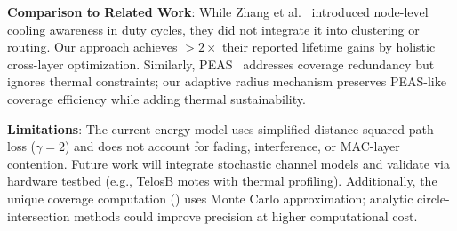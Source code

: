 \textbf{Comparison to Related Work}: While Zhang et al.~\cite{zhang_cooling2021} introduced node-level cooling awareness in duty cycles, they did not integrate it into clustering or routing. Our approach achieves $>2\times$ their reported lifetime gains by holistic cross-layer optimization. Similarly, PEAS~\cite{ye2003peas} addresses coverage redundancy but ignores thermal constraints; our adaptive radius mechanism preserves PEAS-like coverage efficiency while adding thermal sustainability.

\textbf{Limitations}: The current energy model uses simplified distance-squared path loss ($\gamma=2$) and does not account for fading, interference, or MAC-layer contention. Future work will integrate stochastic channel models and validate via hardware testbed (e.g., TelosB motes with thermal profiling). Additionally, the unique coverage computation () uses Monte Carlo approximation; analytic circle-intersection methods could improve precision at higher computational cost.
